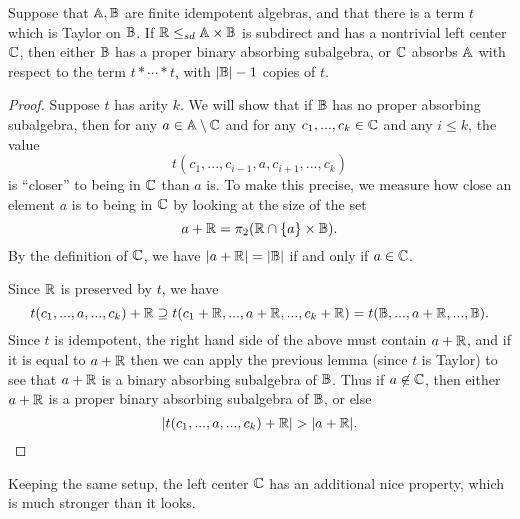 \documentclass[letterpaper,11pt]{article}
\begin{document}
\begin{thm} Suppose that $\mathbb{A}, \mathbb{B}$ are finite idempotent algebras, and that there is a term $t$ which is Taylor on $\mathbb{B}$. If $\mathbb{R} \le_{sd} \mathbb{A} \times \mathbb{B}$ is subdirect and has a nontrivial left center $\mathbb{C}$, then either $\mathbb{B}$ has a proper binary absorbing subalgebra, or $\mathbb{C}$ absorbs $\mathbb{A}$ with respect to the term $t*\cdots *t$, with $|\mathbb{B}|-1$ copies of $t$.
\end{thm}
\begin{proof} Suppose $t$ has arity $k$. We will show that if $\mathbb{B}$ has no proper absorbing subalgebra, then for any $a \in \mathbb{A} \setminus \mathbb{C}$ and for any $c_1, ..., c_k \in \mathbb{C}$ and any $i \le k$, the value
\[
t(c_1, ..., c_{i-1}, a, c_{i+1}, ..., c_k)
\]
is ``closer'' to being in $\mathbb{C}$ than $a$ is. To make this precise, we measure how close an element $a$ is to being in $\mathbb{C}$ by looking at the size of the set
\[
a+\mathbb{R} = \pi_2(\mathbb{R} \cap \{a\}\times \mathbb{B}).
\]
By the definition of $\mathbb{C}$, we have $|a + \mathbb{R}| = |\mathbb{B}|$ if and only if $a \in \mathbb{C}$.

Since $\mathbb{R}$ is preserved by $t$, we have
\[
t(c_1, ..., a, ..., c_k) + \mathbb{R} \supseteq t(c_1+\mathbb{R}, ..., a+\mathbb{R}, ..., c_k+\mathbb{R}) = t(\mathbb{B}, ..., a + \mathbb{R}, ..., \mathbb{B}).
\]
Since $t$ is idempotent, the right hand side of the above must contain $a+\mathbb{R}$, and if it is equal to $a+\mathbb{R}$ then we can apply the previous lemma (since $t$ is Taylor) to see that $a+\mathbb{R}$ is a binary absorbing subalgebra of $\mathbb{B}$. Thus if $a \not\in \mathbb{C}$, then either $a + \mathbb{R}$ is a proper binary absorbing subalgebra of $\mathbb{B}$, or else
\[
|t(c_1, ..., a, ..., c_k) + \mathbb{R}| > |a+\mathbb{R}|.\qedhere
\]
\end{proof}

Keeping the same setup, the left center $\mathbb{C}$ has an additional nice property, which is much stronger than it looks.
\end{document}
